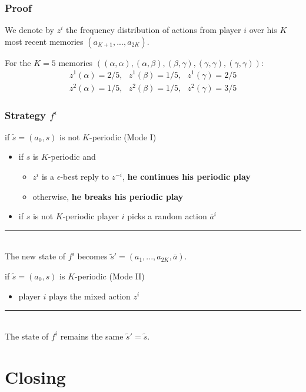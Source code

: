 \documentclass{beamer}
\begin{document}
\begin{frame}
    \frametitle{Proof}
    \begin{definition}
        We denote by $z^i$ the frequency distribution of actions from player $i$
        over his $K$ most recent memories $(a_{K+1}, ..., a_{2K})$.
    \end{definition}
    \pause
    \begin{example}
        For the $K=5$ memories %
			$((\alpha, \alpha), (\alpha, \beta), (\beta, \gamma), (\gamma, \gamma), (\gamma, \gamma))$:
        \begin{gather*}
            z^1(\alpha) = 2/5, \,\,\,\, z^1(\beta) = 1/5, \,\,\,\, z^1(\gamma) = 2/5\\
            z^2(\alpha) = 1/5, \,\,\,\, z^2(\beta) = 1/5, \,\,\,\, z^2(\gamma) = 3/5
        \end{gather*}
    \end{example}
\end{frame}

\begin{frame}
    \frametitle{Strategy $f^i$}
    \pause
    \begin{exampleblock}{if $\tilde{s} = (a_0, s)$ is not $K$-periodic (Mode I)}
        \pause
        \begin{itemize}
            \item<3-> if $s$ is $K$-periodic and
                
                \begin{itemize}
                    \item<4-> $z^i$ is a $\epsilon$-best reply to $z^{-i}$,
                    \textbf<4>{he continues his periodic play}
			
			        \item<5-> otherwise, \textbf<5>{he breaks his periodic play}
                \end{itemize}
			
			\item<6-> if $s$ is not $K$-periodic player $i$ picks a random action $\bar{a}^i$
        \end{itemize}
        \vspace{-5pt}
        \textcolor{eth}{\noindent\rule{\textwidth}{0.7pt}}\\
        The new state of $f^i$ becomes $\tilde{s}' = (a_1, ..., a_{2K}, \bar{a})$.
    \end{exampleblock}
    \begin{exampleblock}{if $\tilde{s} = (a_0, s)$ is $K$-periodic (Mode II)}
        \begin{itemize}
			\item player $i$ plays the mixed action $z^i$
        \end{itemize}
        \vspace{-5pt}
        \textcolor{eth}{\noindent\rule{\textwidth}{0.7pt}}\\
        The state of $f^i$ remains the same $\tilde{s}' = \tilde{s}$.
    \end{exampleblock}
\end{frame}

\section{Closing}
 
\end{document}
